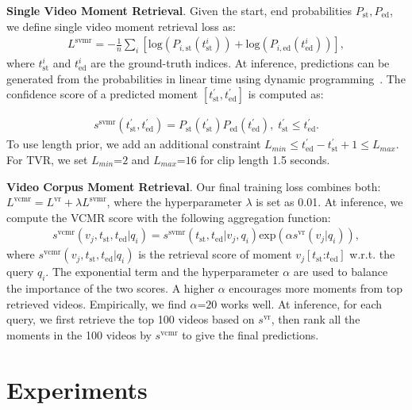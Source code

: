 \documentclass[runningheads]{llncs}
\begin{document}
\kern1mm
\noindent\textbf{Single Video Moment Retrieval}.
Given the start, end probabilities $P_{\mathrm{st}}, P_{\mathrm{ed}}$, we define single video moment retrieval loss as:
\begin{align}
\label{eq:svmr_score}
L^{\mathrm{svmr}} = - \frac{1}{n} \sum_i [\mathrm{log}(P_{i, \mathrm{st}}(t_{\mathrm{st}}^i)) + \mathrm{log}(P_{i, \mathrm{ed}}(t_{\mathrm{ed}}^i))],
\end{align}
where $t_{\mathrm{st}}^i$ and $t_{\mathrm{ed}}^i$ are the ground-truth indices.
At inference, predictions can be generated from the probabilities in linear time using dynamic programming~\cite{seo2016bidirectional}. The confidence score of a predicted moment $[ t_{\mathrm{st}}^{'}, t_{\mathrm{ed}}^{'}]$ is computed as: 

\begin{align}
s^{\mathrm{svmr}}(t_{\mathrm{st}}^{'}, t_{\mathrm{ed}}^{'}) = P_{\mathrm{st}}( t_{\mathrm{st}}^{'})P_{\mathrm{ed}}( t_{\mathrm{ed}}^{'}), \;t_{\mathrm{st}}^{'} \leq  t_{\mathrm{ed}}^{'}.
\end{align}
\noindent
To use length prior, we add an additional constraint $L_{min} \leq t_{\mathrm{ed}}^{'} - t_{\mathrm{st}}^{'} + 1 \leq L_{max}$. For TVR, we set $L_{min}\mbox{=}2$ and $L_{max}\mbox{=}16$ for clip length 1.5 seconds.

\kern1mm
\noindent\textbf{Video Corpus Moment Retrieval}. 
Our final training loss combines both: $L^{\mathrm{vcmr}} = L^{\mathrm{vr}} + \lambda L^{\mathrm{svmr}}$, where the hyperparameter $\lambda$ is set as 0.01.
At inference, we compute the VCMR score with the following aggregation function:
\begin{align}
\label{eq:vcmr_score}
s^{\mathrm{vcmr}}(v_j, t_{\mathrm{st}}, t_{\mathrm{ed}} | q_i) =  s^{\mathrm{svmr}}(t_{\mathrm{st}}, t_{\mathrm{ed}} | v_j, q_i) \mathrm{exp}(\alpha s^{\mathrm{vr}}(v_j | q_i)),
\end{align}
where $s^{\mathrm{vcmr}}(v_j, t_{\mathrm{st}}, t_{\mathrm{ed}} | q_i)$ is the retrieval score of moment $v_j[t_{\mathrm{st}}\mbox{:} t_{\mathrm{ed}}]$ w.r.t. the query $q_i$. 
The exponential term and the hyperparameter $\alpha$ are used to balance the importance of the two scores. 
A higher $\alpha$ encourages more moments from top retrieved videos. 
Empirically, we find $\alpha\mbox{=}20$ works well. 
At inference, for each query, we first retrieve the top 100 videos based on $s^{\mathrm{vr}}$, then rank all the moments in the 100 videos by $s^{\mathrm{vcmr}}$ to give the final predictions. 
 \section{Experiments}\label{experiments}
\end{document}
